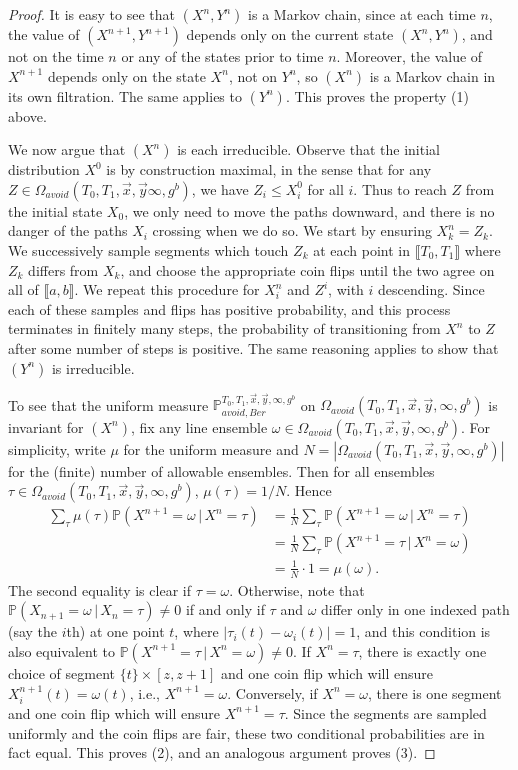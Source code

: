 \documentclass[12pt]{article}
\begin{document}
\begin{proof}
	It is easy to see that $(X^n,Y^n)$ is a Markov chain, since at each time $n$, the value of $(X^{n+1},Y^{n+1})$ depends only on the current state $(X^n,Y^n)$, and not on the time $n$ or any of the states prior to time $n$. Moreover, the value of $X^{n+1}$ depends only on the state $X^n$, not on $Y^n$, so $(X^n)$ is a Markov chain in its own filtration. The same applies to $(Y^n)$. This proves the property (1) above.
	
	We now argue that $(X^n)$ is each irreducible. Observe that the initial distribution $X^0$ is by construction maximal, in the sense that for any $Z\in \Omega_{avoid}(T_0,T_1,\vec{x},\vec{y}\infty,g^b)$, we have $Z_i \leq X^0_i$ for all $i$. Thus to reach $Z$ from the initial state $X_0$, we only need to move the paths downward, and there is no danger of the paths $X_i$ crossing when we do so. We start by ensuring $X^n_k = Z_k$. We successively sample segments which touch $Z_k$ at each point in $\llbracket T_0,T_1\rrbracket$ where $Z_k$ differs from $X_k$, and choose the appropriate coin flips until the two agree on all of $\llbracket a,b\rrbracket$. We repeat this procedure for $X^n_i$ and $Z^i$, with $i$ descending. Since each of these samples and flips has positive probability, and this process terminates in finitely many steps, the probability of transitioning from $X^n$ to $Z$ after some number of steps is positive. The same reasoning applies to show that $(Y^n)$ is irreducible.
	
	To see that the uniform measure $\mathbb{P}_{avoid,Ber}^{T_0,T_1,\vec{x},\vec{y},\infty,g^b}$ on $\Omega_{avoid}(T_0,T_1,\vec{x},\vec{y},\infty,g^b)$ is invariant for $(X^n)$, fix any line ensemble $\omega\in\Omega_{avoid}(T_0,T_1,\vec{x},\vec{y},\infty,g^b)$. For simplicity, write $\mu$ for the uniform measure and $N=|\Omega_{avoid}(T_0,T_1,\vec{x},\vec{y},\infty,g^b)|$ for the (finite) number of allowable ensembles. Then for all ensembles $\tau\in\Omega_{avoid}(T_0,T_1,\vec{x},\vec{y},\infty,g^b)$, $\mu(\tau) = 1/N$. Hence
	\begin{align*}
	\sum_\tau \mu(\tau)\mathbb{P}(X^{n+1} = \omega\,|\,X^n = \tau) &= \frac{1}{N}\sum_\tau \mathbb{P}(X^{n+1} = \omega\,|\,X^n = \tau)\\
	&= \frac{1}{N}\sum_\tau \mathbb{P}(X^{n+1} = \tau\,|\,X^n = \omega)\\
	&= \frac{1}{N}\cdot 1 = \mu(\omega).
	\end{align*}
	The second equality is clear if $\tau=\omega$. Otherwise, note that $\mathbb{P}(X_{n+1} = \omega\,|\,X_n = \tau) \neq 0$ if and only if $\tau$ and $\omega$ differ only in one indexed path (say the $i$th) at one point $t$, where $|\tau_i(t)-\omega_i(t)|=1$, and this condition is also equivalent to $\mathbb{P}(X^{n+1} = \tau\,|\,X^n = \omega) \neq 0$. If $X^n=\tau$, there is exactly one choice of segment $\{t\}\times[z,z+1]$ and one coin flip which will ensure $X^{n+1}_i(t)=\omega(t)$, i.e., $X^{n+1}=\omega$. Conversely, if $X^n=\omega$, there is one segment and one coin flip which will ensure $X^{n+1}=\tau$. Since the segments are sampled uniformly and the coin flips are fair, these two conditional probabilities are in fact equal. This proves (2), and an analogous argument proves (3).
	

\end{proof}
\end{document}
